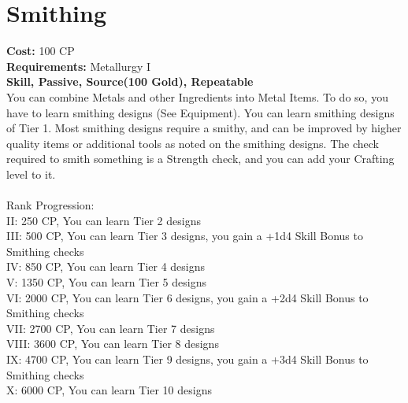 \section{Smithing}\label{perk:smithing}
\textbf{Cost:} 100 CP\\
\textbf{Requirements:} Metallurgy I\\
\textbf{Skill, Passive, Source(100 Gold), Repeatable}\\
You can combine Metals and other Ingredients into Metal Items.
To do so, you have to learn smithing designs (See Equipment).
You can learn smithing designs of Tier 1.
Most smithing designs require a smithy, and can be improved by higher quality items or additional tools as noted on the smithing designs.
The check required to smith something is a Strength check, and you can add your Crafting level to it.\\
\\
Rank Progression:\\
II: 250 CP, You can learn Tier 2 designs\\
III: 500 CP, You can learn Tier 3 designs, you gain a +1d4 Skill Bonus to Smithing checks\\
IV: 850 CP, You can learn Tier 4 designs\\
V: 1350 CP, You can learn Tier 5 designs\\
VI: 2000 CP, You can learn Tier 6 designs, you gain a +2d4 Skill Bonus to Smithing checks\\
VII: 2700 CP, You can learn Tier 7 designs\\
VIII: 3600 CP, You can learn Tier 8 designs\\
IX: 4700 CP, You can learn Tier 9 designs, you gain a +3d4 Skill Bonus to Smithing checks\\
X: 6000 CP, You can learn Tier 10 designs\\